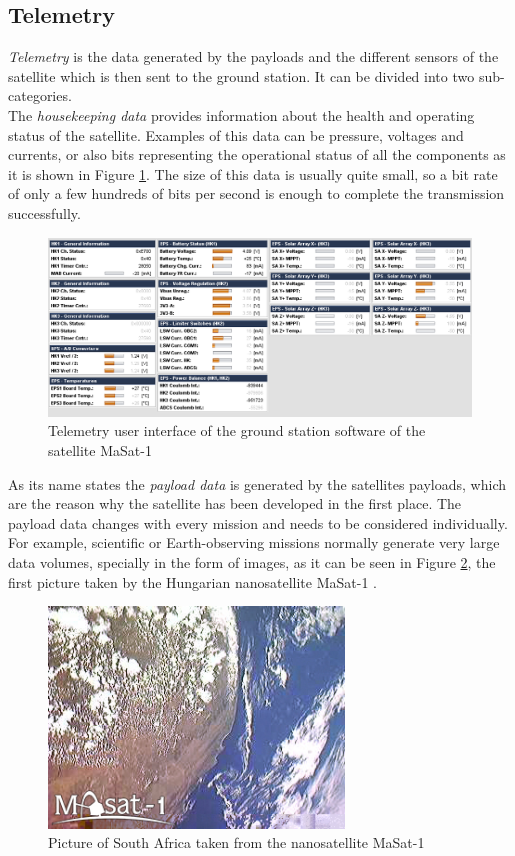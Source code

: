 \subsection{Telemetry}

\emph{Telemetry} is the data generated by the payloads and the different sensors of the satellite which is then sent to the ground station. It can be divided into two sub-categories.\\

The \emph{housekeeping data} provides information about the health and operating status of the satellite. Examples of this data can be pressure, voltages and currents, or also bits representing the operational status of all the components as it is shown in Figure \ref{f2.5}. The size of this data is usually quite small, so a bit rate of only a few hundreds of bits per second is enough to complete the transmission successfully.

\begin{figure}[H]
\centerline{\includegraphics[width=1\textwidth]{images/housekeeping.png}}
\caption{Telemetry user interface of the ground station software of the satellite MaSat-1}
\label{f2.5}
\end{figure}

As its name states the \emph{payload data} is generated by the satellites payloads, which are the reason why the satellite has been developed in the first place. The payload data changes with every mission and needs to be considered individually. For example, scientific or Earth-observing missions normally generate very large data volumes, specially in the form of images, as it can be seen in Figure \ref{f2.6}, the first picture taken by the Hungarian nanosatellite MaSat-1 \cite{Masat}.

\begin{figure}[H]
\centerline{\includegraphics[width=0.7\textwidth]{images/masat.jpg}}
\caption{Picture of South Africa taken from the nanosatellite MaSat-1}
\label{f2.6}
\end{figure}

